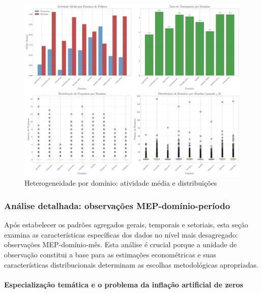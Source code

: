 \begin{figure}[htbp]
\centering
\includegraphics[width=\textwidth]{figures/fig3_domain_heterogeneity.pdf}
\caption{Heterogeneidade por domínio: atividade média e distribuições}
\label{fig:domain_heterogeneity}
\end{figure}

\subsubsection{Análise detalhada: observações MEP-domínio-período}

Após estabelecer os padrões agregados gerais, temporais e setoriais, esta seção examina as características específicas dos dados no nível mais desagregado: observações MEP-domínio-mês. Esta análise é crucial porque a unidade de observação constitui a base para as estimações econométricas e suas características distribucionais determinam as escolhas metodológicas apropriadas.

\paragraph{Especialização temática e o problema da inflação artificial de zeros}


